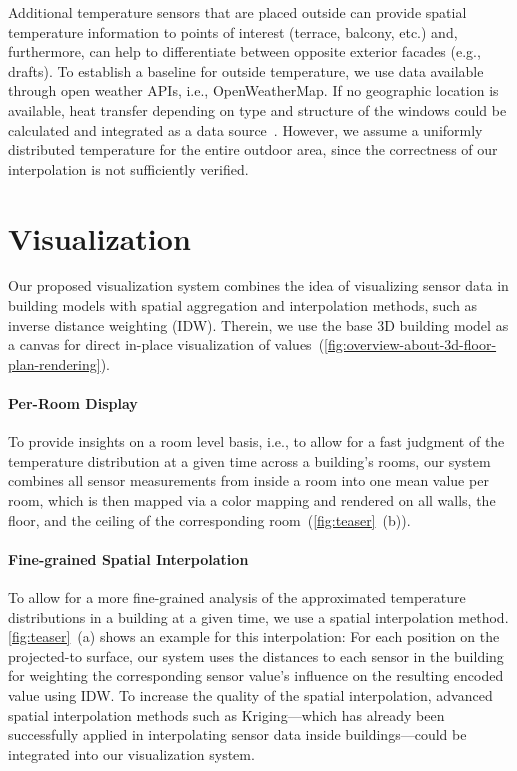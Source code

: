 \documentclass{egpubl}
\begin{document}
Additional temperature sensors that are placed outside can provide spatial temperature information to points of interest (terrace, balcony, etc.) and, furthermore, can help to differentiate between opposite exterior facades (e.g., drafts).
To establish a baseline for outside temperature, we use data available through open weather APIs, i.e., OpenWeatherMap.
If no geographic location is available, heat transfer depending on type and structure of the windows could be calculated and integrated as a data source~\cite{arici2015-flow}.
However, we assume a uniformly distributed temperature for the entire outdoor area, since the correctness of our interpolation is not sufficiently verified.

\section{Visualization}

Our proposed visualization system 
combines the idea of visualizing sensor data in building models\cite{chang2018-automated} with spatial aggregation and interpolation methods, such as inverse distance weighting (IDW)\cite{shepard1968-two}.
Therein, we use the base 3D building model as a canvas for direct in-place visualization of values~(\autoref{fig:overview-about-3d-floor-plan-rendering}).

\paragraph*{Per-Room Display} 

To provide insights on a room level basis, i.e., to allow for a fast judgment of the temperature distribution at a given time across a building’s rooms, our system combines all sensor measurements from inside a room into one mean value per room, which is then mapped via a color mapping and rendered on all walls, the floor, and the ceiling of the corresponding room~(\autoref{fig:teaser}~(b)).

\paragraph*{Fine-grained Spatial Interpolation} %
 
To allow for a more fine-grained analysis of the approximated temperature distributions in a building at a given time, we use a spatial interpolation method.
\autoref{fig:teaser}~(a) shows an example for this interpolation:
For each position on the projected-to surface, our system uses the distances to each sensor in the building for weighting the corresponding sensor value’s influence on the resulting encoded value using IDW. 
To increase the quality of the spatial interpolation, advanced spatial interpolation methods such as Kriging\cite{oliver1990-kriging}---which has already been successfully applied in interpolating sensor data inside buildings\cite{li2018-spatiotemporal}---could be integrated into our visualization system. 
\end{document}
